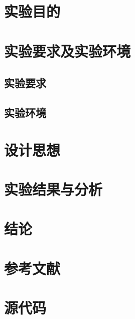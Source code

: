 \documentclass{NET}
\begin{document}
\maketitle

\tableofcontents
\newpage

\section{实验目的}

\section{实验要求及实验环境}

\subsection{实验要求}

\subsection{实验环境}


\section{设计思想}

\section{实验结果与分析}


\section{结论}


\section{参考文献}

\appendix

\section{源代码}
\end{document}
